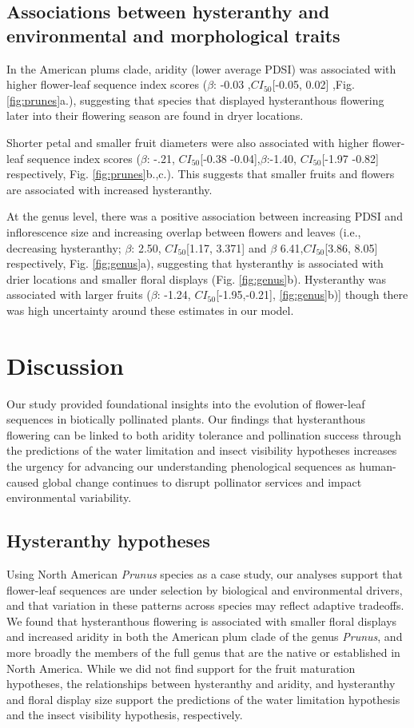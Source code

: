 \documentclass{article}[11pt]
\begin{document}
{\subsection*{Associations between hysteranthy and environmental and morphological traits}
In the American plums clade, aridity (lower average PDSI) was associated with higher flower-leaf sequence index scores ($\beta$: -0.03 ,$CI_{50}$[-0.05,  0.02] ,Fig. \ref{fig:prunes}a.), suggesting that species that displayed hysteranthous flowering later into their flowering season are found in dryer locations. 

Shorter petal and smaller fruit diameters were also associated with higher flower-leaf sequence index scores ($\beta$: -.21, $CI_{50}$[-0.38 -0.04],$\beta$:-1.40, $CI_{50}$[-1.97 -0.82] respectively, Fig. \ref{fig:prunes}b.,c.). This suggests that smaller fruits and flowers are associated with increased hysteranthy.

At the genus level, there was a positive association between increasing PDSI and inflorescence size and increasing overlap between flowers and leaves (i.e., decreasing hysteranthy; $\beta$: 2.50, $CI_{50}$[1.17, 3.371] and $\beta$ 6.41,$CI_{50}$[3.86, 8.05] respectively, Fig. \ref{fig:genus}a), suggesting that hysteranthy is associated with drier locations and smaller floral displays (Fig. \ref{fig:genus}b). Hysteranthy was associated with larger fruits  ($\beta$: -1.24, $CI_{50}$[-1.95,-0.21], \ref{fig:genus}b)]  though there was high uncertainty around these estimates in our model. 

\section*{Discussion}
Our study provided foundational insights into the evolution of flower-leaf sequences in biotically pollinated plants. Our findings that hysteranthous flowering can be linked to both aridity tolerance and pollination success through the predictions of the water limitation and insect visibility hypotheses increases the urgency for advancing our understanding phenological sequences as human-caused global change continues to disrupt pollinator services and impact environmental variability. 

\subsection*{Hysteranthy hypotheses}
Using North American \textit{Prunus} species as a case study, our analyses support that flower-leaf sequences are under selection by biological and environmental drivers, and that variation in these patterns across species may reflect adaptive tradeoffs. We found that hysteranthous flowering is associated with smaller floral displays and increased aridity in both the American plum clade of the genus \emph{Prunus}, and more broadly the members of the full genus that are the native or established in North America. While we did not find support for the fruit maturation hypotheses, the relationships between hysteranthy and aridity, and hysteranthy and floral display size support the predictions of the water limitation hypothesis and the insect visibility hypothesis, respectively. 

}
\end{document}
